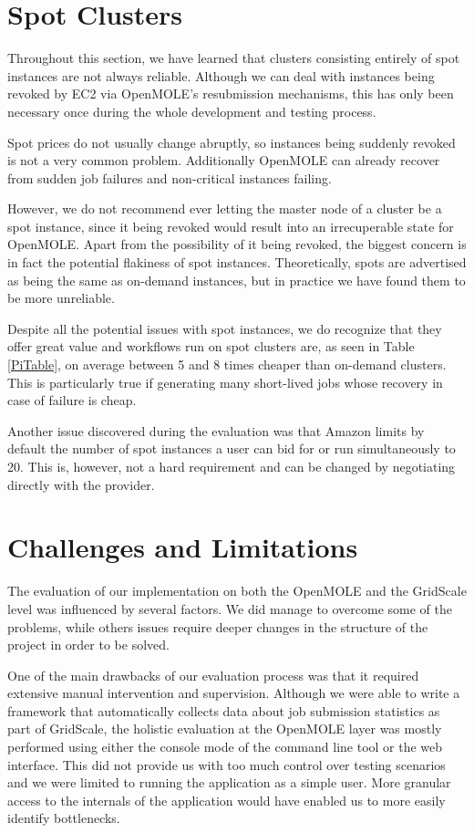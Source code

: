 \section{Spot Clusters}

Throughout this section, we have learned that clusters consisting entirely of spot instances are not always reliable. Although we can deal with instances being revoked by EC2 via OpenMOLE's resubmission mechanisms, this has only been necessary once  during the whole development and testing process. 

Spot prices do not usually change abruptly, so instances being suddenly revoked is not a very common problem. Additionally OpenMOLE can already recover from sudden job failures and non-critical instances failing.

However, we do not recommend ever letting the master node of a cluster be a spot instance, since it being revoked would result into an irrecuperable state for OpenMOLE. Apart from the possibility of it being revoked, the biggest concern is in fact the potential flakiness of spot instances. Theoretically, spots are advertised as being the same as on-demand instances, but in practice we have found them to be more unreliable.

Despite all the potential issues with spot instances, we do recognize that they offer great value and workflows run on spot clusters are, as seen in Table \ref{PiTable}, on average between 5 and 8 times cheaper than on-demand clusters. This is particularly true if generating many short-lived jobs whose recovery in case of failure is cheap.

Another issue discovered during the evaluation was that Amazon limits by default the number of spot instances a user can bid for or run simultaneously to 20. This is, however, not a hard requirement and can be changed by negotiating directly with the provider.

\section{Challenges and Limitations}

The evaluation of our implementation on both the OpenMOLE and the GridScale level was influenced by several factors. We did manage to overcome some of the problems, while others issues require deeper changes in the structure of the project in order to be solved.

One of the main drawbacks of our evaluation process was that it required extensive manual intervention and supervision. Although we were able to write a framework that automatically collects data about job submission statistics as part of GridScale, the holistic evaluation at the OpenMOLE layer was mostly performed using either the console mode of the command line tool or the web interface. This did not provide us with too much control over testing scenarios and we were limited to running the application as a simple user. More granular access to the internals of the application would have enabled us to more easily identify bottlenecks.

